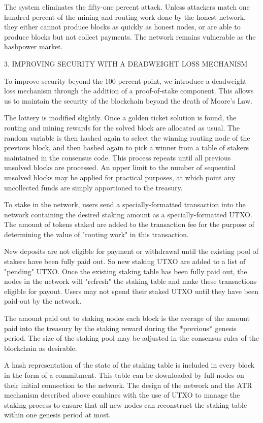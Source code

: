 \documentclass[11.5pt, oneside]{article}   	%
\begin{document}
\begin{multicols}{2}
The system eliminates the fifty-one percent attack. Unless attackers match one hundred percent of the mining and routing work done by the honest network, they either cannot produce blocks as quickly as honest nodes, or are able to produce blocks but not collect payments. The network remains vulnerable as the hashpower market.

3. IMPROVING SECURITY WITH A DEADWEIGHT LOSS MECHANISM

To improve security beyond the 100 percent point, we introduce a deadweight-loss mechanism through the addition of a proof-of-stake component. This allows us to maintain the security of the blockchain beyond the death of Moore's Law.

The lottery is modified slightly. Once a golden ticket solution is found, the routing and mining rewards for the solved block are allocated as usual. The random variable is then hashed again to select the winning routing node of the previous block, and then hashed again to pick a winner from a table of stakers maintained in the consensus code. This process repeats until all previous unsolved blocks are processed. An upper limit to the number of sequential unsolved blocks may be applied for practical purposes, at which point any uncollected funds are simply apportioned to the treasury.

To stake in the network, users send a specially-formatted transaction into the network containing the desired staking amount as a specially-formatted UTXO. The amount of tokens staked are added to the transaction fee for the purpose of determining the value of "routing work" in this transaction.

New deposits are not eligible for payment or withdrawal until the existing pool of stakers have been fully paid out. So new staking UTXO are added to a list of "pending" UTXO. Once the existing staking table has been fully paid out, the nodes in the network will "refresh" the staking table and make these transactions eligible for payout. Users may not spend their staked UTXO until they have been paid-out by the network.

The amount paid out to staking nodes each block is the average of the amount paid into the treasury by the staking reward during the *previous* genesis period. The size of the staking pool may be adjusted in the consensus rules of the blockchain as desirable.

A hash representation of the state of the staking table is included in every block in the form of a commitment. This table can be downloaded by full-nodes on their initial connection to the network. The design of the network and the ATR mechanism described above combines with the use of UTXO to manage the staking process to ensure that all new nodes can reconstruct the staking table within one genesis period at most.


\end{multicols}
\end{document}

